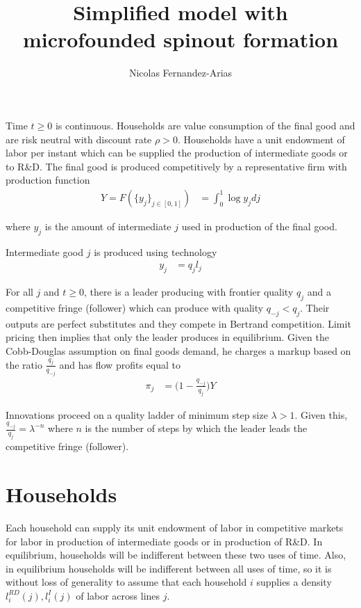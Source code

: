\documentclass[12pt,english]{article}
\theoremstyle{remark}
\begin{document}
	
\title{Simplified model with microfounded spinout formation}
\author{Nicolas Fernandez-Arias}
\maketitle

Time $t \ge 0$ is continuous. Households are value consumption of the final good and are risk neutral with discount rate $\rho > 0$. Households have a unit endowment of labor per instant which can be supplied the production of intermediate goods or to R\&D. The final good is produced competitively by a representative firm with production function 
\begin{align}
	Y = F(\{y_j\}_{j \in [0,1]}) &= \int_0^1 \log y_j dj
\end{align}

where $y_j$ is the amount of intermediate $j$ used in production of the final good. 

Intermediate good $j$ is produced using technology
\begin{align}
	y_j &= q_j l_j 
\end{align}

For all $j$ and $t \ge 0$, there is a leader producing with frontier quality $q_j$ and a competitive fringe (follower) which can produce with quality $q_{-j} < q_j$. Their outputs are perfect substitutes and they compete in Bertrand competition. Limit pricing then implies that only the leader produces in equilibrium. Given the Cobb-Douglas assumption on final goods demand, he charges a markup based on the ratio $\frac{q_j}{q_{-j}}$ and has flow profits equal to 
\begin{align}
	\pi_j &= \Big( 1 - \frac{q_{-j}}{q_j} \Big) Y
\end{align}

Innovations proceed on a quality ladder of minimum step size $\lambda > 1$. Given this, $\frac{q_{-j}}{q_j} = \lambda^{-n}$ where $n$ is the number of steps by which the leader leads the competitive fringe (follower). 

\section{Households}

Each household can supply its unit endowment of labor in competitive markets for labor in production of intermediate goods or in production of R\&D. In equilibrium, households will be indifferent between these two uses of time. Also, in equilibrium households will be indifferent between all uses of time, so it is without loss of generality to assume that each household $i$ supplies a density $l_{i}^{RD}(j),l_{i}^I(j)$ of labor across lines $j$. 
\end{document}
